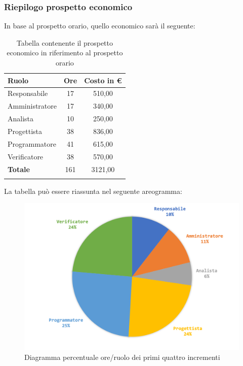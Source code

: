 		\subsubsection{Riepilogo prospetto economico}
		In base al prospetto orario, quello economico sarà il seguente: 
		
		\begin{longtable}{|l|c|c|}
			\hline
			\rowcolor{lighter-grayer}
			\textbf{Ruolo} & \textbf{Ore} & \textbf{Costo in € } \\
			\hline
			\endfirsthead
			
			\hline
			Responsabile 	    & 17 & 510,00\\
			\hline 
			\hline
			Amministratore	   & 17 & 340,00\\
			\hline
			\hline
			Analista 				& 10 & 250,00\\
			\hline
			\hline
			Progettista 		   & 38 & 836,00\\
			\hline
			\hline
			Programmatore 	  & 41 & 615,00\\
			\hline
			\hline
			Verificatore 		   & 38 & 570,00\\
			\hline
			\textbf{Totale} 	 & 161 & 3121,00\\
			\hline
			\caption{Tabella contenente il prospetto economico in riferimento al prospetto orario}
		\end{longtable}
		\pagebreak
		
		La tabella può essere riassunta nel seguente areogramma:
		\begin{figure}[H]
			\centering
			\includegraphics[width=0.8\linewidth]{./images/preventivo/incremento1-4-2.png}
			\caption{Diagramma percentuale ore/ruolo dei primi quattro incrementi}
			\label{fig:diagramma costi ruolo incrementi I-IV}
		\end{figure}
		
